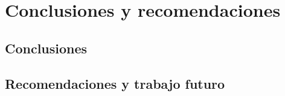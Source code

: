 \chapter{Conclusiones y recomendaciones}
\label{ch:conclusiones}

\section{Conclusiones}
\label{sec:conclusiones}


\section{Recomendaciones y trabajo futuro}
\label{sec:recomendaciones}


